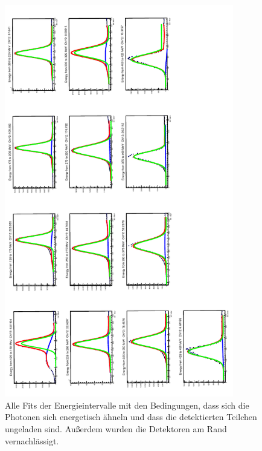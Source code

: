 \documentclass[a4paper,11pt,oneside,final,german,openbib,pdftex]{scrbook}
\begin{document}
{\begin{appendix}
\begin{figure}[h!]
	\begin{center}
		\includegraphics[width=100mm]{20170405Strahlzeit30DegreeCutAllFits}
		\caption[Strahlzeit: 2D-Hist ohne Detektoren am Rand; alle Fits]{Alle Fits der Energieintervalle mit den Bedingungen, dass sich die Photonen sich energetisch ähneln und dass die detektierten Teilchen ungeladen sind. Au{\ss}erdem wurden die Detektoren am Rand vernachl\"assigt.}
		\label{fig:30-Degree-Cut-RealData-All-Fits}
	\end{center}
\end{figure}







\end{appendix}}
\end{document}
